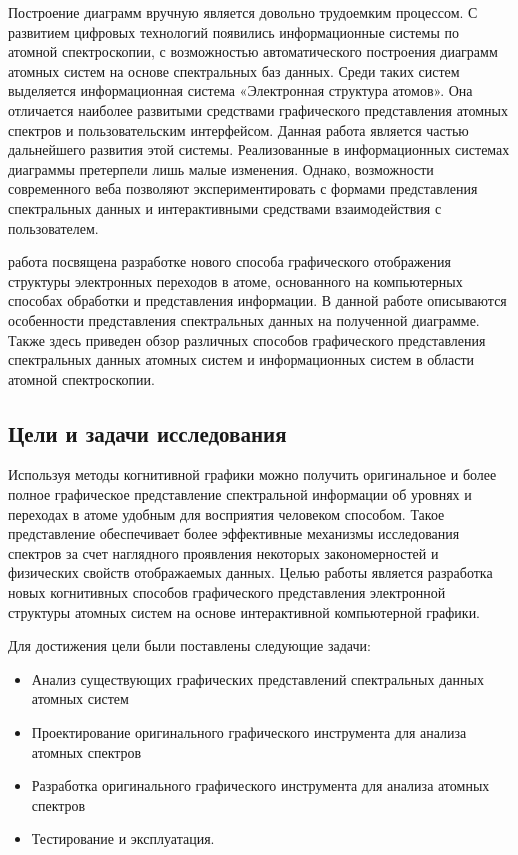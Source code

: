 \documentclass[a4paper, 12pt]{article}
\begin{document}
    Построение диаграмм вручную является довольно трудоемким процессом. С развитием цифровых технологий появились информационные системы по атомной спектроскопии, с возможностью автоматического построения диаграмм атомных систем на основе спектральных баз данных. Среди таких систем выделяется информационная система «Электронная структура атомов». Она отличается наиболее развитыми средствами графического представления атомных спектров и пользовательским интерфейсом. Данная работа является частью дальнейшего развития этой системы. Реализованные в информационных системах диаграммы претерпели лишь малые изменения. Однако, возможности современного веба позволяют экспериментировать с формами представления спектральных данных и интерактивными средствами взаимодействия с пользователем.
    
         работа посвящена разработке нового способа графического отображения структуры электронных переходов в атоме, основанного на компьютерных способах обработки и представления информации. В данной работе описываются особенности представления спектральных данных на полученной диаграмме. Также здесь приведен обзор различных способов графического представления спектральных данных атомных систем и информационных систем в области атомной спектроскопии.\fi
    
    \subsection*{Цели и задачи исследования}
    Используя методы когнитивной графики можно получить оригинальное и более полное графическое представление спектральной информации об уровнях и переходах в атоме удобным для восприятия человеком способом. Такое представление обеспечивает более эффективные механизмы исследования спектров за счет наглядного проявления некоторых закономерностей и физических свойств отображаемых данных. Целью работы является разработка новых когнитивных способов графического представления электронной структуры атомных систем на основе интерактивной компьютерной графики.\par 
    Для достижения цели были поставлены следующие задачи:
    \begin{itemize}
        \item Анализ существующих графических представлений спектральных данных атомных систем
        \item Проектирование оригинального графического инструмента для анализа атомных спектров
        \item Разработка оригинального графического инструмента для анализа атомных спектров
        \item Тестирование и эксплуатация.
    \end{itemize}
    
\end{document}
